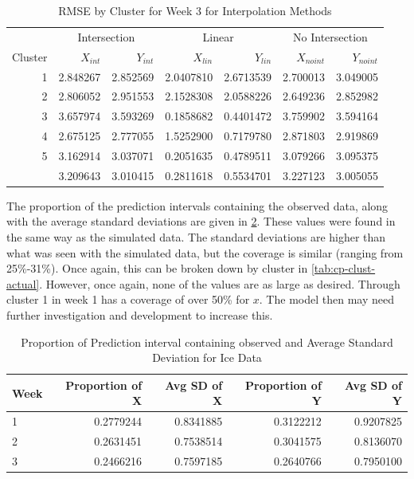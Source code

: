 \documentclass[12pt]{article}
\begin{document}
\begin{table}

\caption{\label{tab:results-clust3-actual}RMSE by Cluster for Week 3 for Interpolation Methods}
\centering
\begin{tabular}[t]{rrrrrrr}
\toprule
\multicolumn{1}{c}{ } & \multicolumn{2}{c}{Intersection} & \multicolumn{2}{c}{Linear} & \multicolumn{2}{c}{No Intersection} \\
\cmidrule(l{3pt}r{3pt}){2-3} \cmidrule(l{3pt}r{3pt}){4-5} \cmidrule(l{3pt}r{3pt}){6-7}
Cluster & $X_{int}$ & $Y_{int}$ & $X_{lin}$ & $Y_{lin}$ & $X_{noint}$ & $Y_{noint}$\\
\midrule
1 & 2.848267 & 2.852569 & 2.0407810 & 2.6713539 & 2.700013 & 3.049005\\
2 & 2.806052 & 2.951553 & 2.1528308 & 2.0588226 & 2.649236 & 2.852982\\
3 & 3.657974 & 3.593269 & 0.1858682 & 0.4401472 & 3.759902 & 3.594164\\
4 & 2.675125 & 2.777055 & 1.5252900 & 0.7179780 & 2.871803 & 2.919869\\
5 & 3.162914 & 3.037071 & 0.2051635 & 0.4789511 & 3.079266 & 3.095375\\
\addlinespace
6 & 3.209643 & 3.010415 & 0.2811618 & 0.5534701 & 3.227123 & 3.005055\\
\bottomrule
\end{tabular}
\end{table}

The proportion of the prediction intervals containing the observed data,
along with the average standard deviations are given in
\cref{tab:cp-table}. These values were found in the same way as the
simulated data. The standard deviations are higher than what was seen
with the simulated data, but the coverage is similar (ranging from
25\%-31\%). Once again, this can be broken down by cluster in
\cref{tab:cp-clust-actual}. However, once again, none of the values are
as large as desired. Through cluster 1 in week 1 has a coverage of over
50\% for \(x\). The model then may need further investigation and
development to increase this.

\begin{table}

\caption{\label{tab:cp-table}Proportion of Prediction interval containing observed and Average Standard Deviation for Ice Data}
\centering
\begin{tabular}[t]{lrrrr}
\toprule
Week & Proportion of X & Avg SD of X & Proportion of Y & Avg SD of Y\\
\midrule
1 & 0.2779244 & 0.8341885 & 0.3122212 & 0.9207825\\
2 & 0.2631451 & 0.7538514 & 0.3041575 & 0.8136070\\
3 & 0.2466216 & 0.7597185 & 0.2640766 & 0.7950100\\
\bottomrule
\end{tabular}
\end{table}
\end{document}
